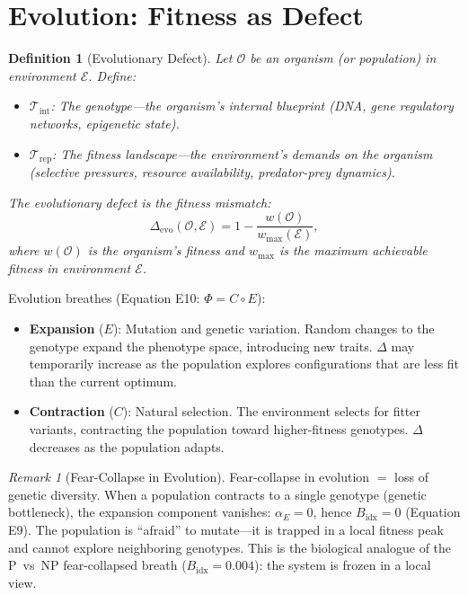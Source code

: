 \documentclass[12pt, openany]{book}
\newtheorem{definition}[theorem]{Definition}
\theoremstyle{remark}
\newtheorem{remark}[theorem]{Remark}
\newcommand{\Tint}{\mathcal{T}_{\mathrm{int}}}
\newcommand{\Trep}{\mathcal{T}_{\mathrm{rep}}}
\begin{document}
\section{Evolution: Fitness as Defect}
\label{sec:evolution}

\begin{definition}[Evolutionary Defect]
\label{def:evo-defect}
Let $\mathcal{O}$ be an organism (or population) in environment $\mathcal{E}$.  Define:
\begin{itemize}
  \item $\Tint$: The genotype---the organism's internal blueprint (DNA, gene regulatory
        networks, epigenetic state).
  \item $\Trep$: The fitness landscape---the environment's demands on the organism
        (selective pressures, resource availability, predator-prey dynamics).
\end{itemize}
The evolutionary defect is the fitness mismatch:
\[
  \Delta_{\mathrm{evo}}(\mathcal{O}, \mathcal{E}) = 1 - \frac{w(\mathcal{O})}{w_{\max}(\mathcal{E})},
\]
where $w(\mathcal{O})$ is the organism's fitness and $w_{\max}$ is the maximum
achievable fitness in environment $\mathcal{E}$.
\end{definition}

\noindent
Evolution breathes (Equation E10: $\Phi = C \circ E$):
\begin{itemize}
  \item \textbf{Expansion} ($E$): Mutation and genetic variation.  Random changes to the
        genotype expand the phenotype space, introducing new traits.  $\Delta$ may
        temporarily increase as the population explores configurations that are
        less fit than the current optimum.
  \item \textbf{Contraction} ($C$): Natural selection.  The environment selects for
        fitter variants, contracting the population toward higher-fitness genotypes.
        $\Delta$ decreases as the population adapts.
\end{itemize}

\begin{remark}[Fear-Collapse in Evolution]
Fear-collapse in evolution $=$ loss of genetic diversity.  When a population
contracts to a single genotype (genetic bottleneck), the expansion component
vanishes: $\alpha_E = 0$, hence $B_{\mathrm{idx}} = 0$ (Equation E9).  The
population is ``afraid'' to mutate---it is trapped in a local fitness peak
and cannot explore neighboring genotypes.  This is the biological analogue
of the P~vs~NP fear-collapsed breath ($B_{\mathrm{idx}} = 0.004$): the system
is frozen in a local view.
\end{remark}
\end{document}
